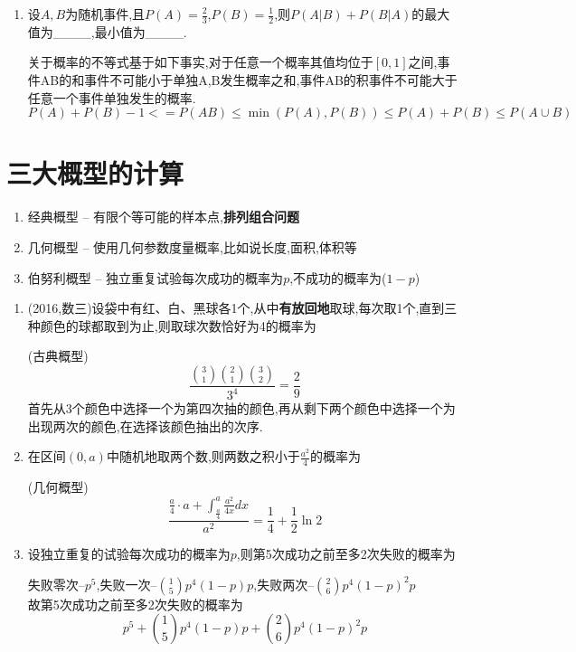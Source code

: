 \documentclass[12pt, a4paper, oneside, UTF8]{ctexbook}
\begin{document}
\begin{enumerate}[label=\arabic*.]
    \item 设$A,B$为随机事件,且$P(A)=\frac{2}{3}$,$P(B)=\frac{1}{2}$,则$P(A|B)+P(B|A)$的最大值为\_\_\_\_,最小值为\_\_\_\_.
    
    \begin{solution}
    关于概率的不等式基于如下事实,对于任意一个概率其值均位于$[0,1]$之间,事件AB的和事件不可能小于单独A,B发生概率之和,事件AB的积事件不可能大于
    任意一个事件单独发生的概率.
    \[
    P(A)+P(B) - 1<=P(AB) \leq \min{(P(A),P(B))}  \leq P(A) + P(B) \leq P(A\cup B) 
    \]
    \end{solution}
\end{enumerate}

\section{三大概型的计算}
\begin{remark}[三大概率模型]
    \begin{enumerate}
    \item 经典概型 -- 有限个等可能的样本点,\textbf{排列组合问题}
    \item 几何概型 -- 使用几何参数度量概率,比如说长度,面积,体积等
    \item 伯努利概型 -- 独立重复试验每次成功的概率为$p$,不成功的概率为($1-p$)
    \end{enumerate}
\end{remark}
\begin{enumerate}[label=\arabic*.,start=6]
    \item (2016,数三)设袋中有红、白、黑球各1个,从中\textbf{有放回地}取球,每次取1个,直到三种颜色的球都取到为止,则取球次数恰好为4的概率为
    
    \begin{solution}
    (古典概型) 
    \[\frac{\binom{3}{1}\binom{2}{1}\binom{3}{2}}{3^4}=\frac{2}{9}\]
    首先从3个颜色中选择一个为第四次抽的颜色,再从剩下两个颜色中选择一个为出现两次的颜色,在选择该颜色抽出的次序.
    \end{solution}
    \item 在区间$(0,a)$中随机地取两个数,则两数之积小于$\frac{a^2}{4}$的概率为
    
    \begin{solution}
    (几何概型)
    \[
    \frac{\frac{a}{4}\cdot a + \int_{\frac{a}{4}}^{a}\frac{a^2}{4x}dx}{a^2} = \frac{1}{4} + \frac{1}{2}\ln{2}
    \]
    \end{solution}
    \item 设独立重复的试验每次成功的概率为$p$,则第5次成功之前至多2次失败的概率为
    
    \begin{solution}
    失败零次--$p^5$,失败一次--$\binom{1}{5}p^4(1-p)p$,失败两次--$\binom{2}{6}p^4(1-p)^2p$ \\
    故第5次成功之前至多2次失败的概率为
    \[
    p^5 + \binom{1}{5}p^4(1-p)p + \binom{2}{6}p^4(1-p)^2p
    \]
    \end{solution}
\end{enumerate}
\end{document}
